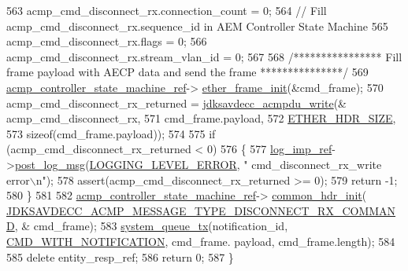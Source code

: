 \begin{DoxyCode}
563     acmp\_cmd\_disconnect\_rx.connection\_count = 0;
564     \textcolor{comment}{// Fill acmp\_cmd\_disconnect\_rx.sequence\_id in AEM Controller State Machine}
565     acmp\_cmd\_disconnect\_rx.flags = 0;
566     acmp\_cmd\_disconnect\_rx.stream\_vlan\_id = 0;
567 
568     \textcolor{comment}{/**************** Fill frame payload with AECP data and send the frame ***************/}
569     \hyperlink{namespaceavdecc__lib_a693c2049de1d4ec860a92126b846ac21}{acmp\_controller\_state\_machine\_ref}->
      \hyperlink{classavdecc__lib_1_1acmp__controller__state__machine_a0a43868a3e99a6cef740e4562d006345}{ether\_frame\_init}(&cmd\_frame);
570     acmp\_cmd\_disconnect\_rx\_returned = \hyperlink{group__acmpdu_ga8cf8b61ba149419878384da1540d9673}{jdksavdecc\_acmpdu\_write}(&
      acmp\_cmd\_disconnect\_rx,
571                                                               cmd\_frame.payload,
572                                                               \hyperlink{namespaceavdecc__lib_a6c827b1a0d973e18119c5e3da518e65ca9512ad9b34302ba7048d88197e0a2dc0}{ETHER\_HDR\_SIZE},
573                                                               \textcolor{keyword}{sizeof}(cmd\_frame.payload));
574 
575     \textcolor{keywordflow}{if} (acmp\_cmd\_disconnect\_rx\_returned < 0)
576     \{
577         \hyperlink{namespaceavdecc__lib_acbe3e2a96ae6524943ca532c87a28529}{log\_imp\_ref}->\hyperlink{classavdecc__lib_1_1log_a68139a6297697e4ccebf36ccfd02e44a}{post\_log\_msg}(\hyperlink{namespaceavdecc__lib_a501055c431e6872ef46f252ad13f85cdaf2c4481208273451a6f5c7bb9770ec8a}{LOGGING\_LEVEL\_ERROR}, \textcolor{stringliteral}{"
      cmd\_disconnect\_rx\_write error\(\backslash\)n"});
578         assert(acmp\_cmd\_disconnect\_rx\_returned >= 0);
579         \textcolor{keywordflow}{return} -1;
580     \}
581 
582     \hyperlink{namespaceavdecc__lib_a693c2049de1d4ec860a92126b846ac21}{acmp\_controller\_state\_machine\_ref}->
      \hyperlink{classavdecc__lib_1_1acmp__controller__state__machine_ae93a117baf9620a7311f950271610506}{common\_hdr\_init}(
      \hyperlink{group__acmp__message__type_ga9878ba27c7130e8f2a405e3ec6c5dcca}{JDKSAVDECC\_ACMP\_MESSAGE\_TYPE\_DISCONNECT\_RX\_COMMAND}, &
      cmd\_frame);
583     \hyperlink{namespaceavdecc__lib_a6dd511685627c0865a3442b539a4e8e9}{system\_queue\_tx}(notification\_id, \hyperlink{namespaceavdecc__lib_aabcadff06aa62be0ce47bc0646823604aba48b8a017e06fb240b650cdea965178}{CMD\_WITH\_NOTIFICATION}, cmd\_frame.
      payload, cmd\_frame.length);
584 
585     \textcolor{keyword}{delete} entity\_resp\_ref;
586     \textcolor{keywordflow}{return} 0;
587 \}
\end{DoxyCode}


